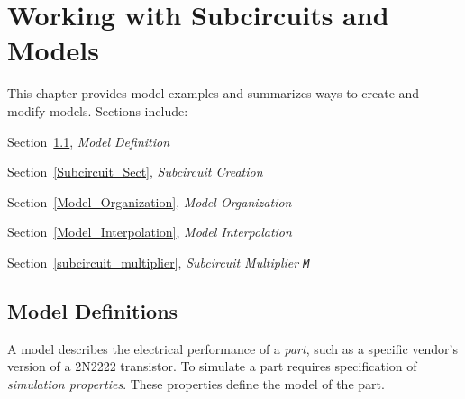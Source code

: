 


\chapter{Working with Subcircuits and Models}
\label{Models}

{
This chapter provides model examples and summarizes ways to create and
modify models.  Sections include:
\begin{XyceItemize}
\item Section~\ref{Model_Def}, {\em Model Definition}
\item Section~\ref{Subcircuit_Sect}, {\em Subcircuit Creation}
\item Section~\ref{Model_Organization}, {\em Model Organization}
\item Section~\ref{Model_Interpolation}, {\em Model Interpolation}
\item Section~\ref{subcircuit_multiplier}, {\em Subcircuit Multiplier \texttt{M}}
\end{XyceItemize}
}

\section{Model Definitions}
\label{Model_Def}

A model describes the electrical performance of a {\em part}, such as
a specific vendor's version of a 2N2222 transistor.  To simulate a
part requires specification of {\em simulation properties}.  
These properties define the model of the part.

